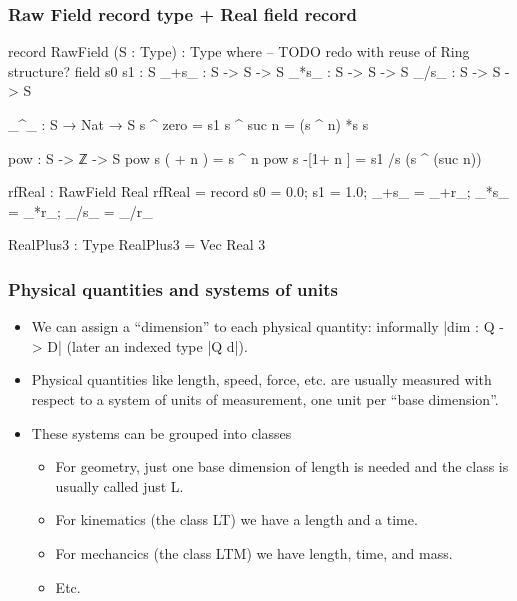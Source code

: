 \documentclass{beamer}
\begin{document}
\begin{frame}
\subsubsection{Raw Field record type + Real field record}
\begin{code}
record RawField (S : Type) : Type where
  -- TODO redo with reuse of Ring structure?
  field
    s0 s1 : S
    _+s_ : S -> S -> S
    _*s_ : S -> S -> S
    _/s_ : S -> S -> S

  _^_ : S → Nat → S
  s ^ zero   = s1
  s ^ suc n  = (s ^ n) *s s

  pow : S -> ℤ -> S
  pow s  ( + n )  =        s ^ n
  pow s -[1+ n ]  = s1 /s (s ^ (suc n))

rfReal : RawField Real
rfReal = record {s0 = 0.0; s1 = 1.0; _+s_ = _+r_; _*s_ = _*r_; _/s_ = _/r_}

RealPlus3 : Type
RealPlus3 = Vec Real 3
\end{code}
\end{frame}
\begin{frame}
  \frametitle{Physical quantities and systems of units}
\begin{itemize}
\item We can assign a ``dimension'' to each physical quantity:
informally |dim : Q -> D| (later an indexed type |Q d|).
\item Physical quantities like length, speed, force, etc. are usually
measured with respect to a system of units of measurement, one unit
per ``base dimension''.

\pause
\item These systems can be grouped into classes
\begin{itemize}
\item For geometry, just one base dimension of length is needed and the
class is usually called just L.
\item For kinematics (the class LT) we have a length and a time.
\item For mechancics (the class LTM) we have length, time, and mass.
\item Etc.
\end{itemize}
\end{itemize}
\end{frame}
\end{document}
